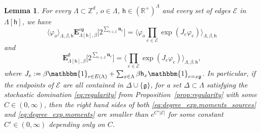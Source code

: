 \documentclass[11pt,a4paper]{article}
\newtheorem{lemma}[theorem]{Lemma}
\theoremstyle{definition}
\numberwithin{equation}{section}
\newcommand\n{\mathbf{n}}
\newcommand\fg{\mathfrak{g}}
\newcommand\Z{\mathbb{Z}}
\begin{document}
\begin{lemma}\label{lem:degree_exp.moments} 
For every $\Lambda\subset \Z^d$, $o\in\Lambda$, $\mathsf{h}\in(\mathbb{R}^+)^\Lambda$ and every set of edges $\mathcal{E}$ in $\Lambda[\mathsf{h}]$, we have
\begin{equation}\label{eq:degree_exp.moments_sources}
\langle\varphi_o\rangle_{\Lambda,\beta,\mathsf{h}}\mathbf{E}_{\Lambda[\mathsf{h}],\beta}^{o\fg} \Big[2^{\sum_{e\in\mathcal{E}} \n_e}\Big] = \langle \varphi_o\prod_{e\in \mathcal{E}}\exp(J_e\varphi_e)\rangle_{\Lambda,\beta,\mathsf{h}}
\end{equation}
and
\begin{equation}\label{eq:degree_exp.moments}
\mathbf{E}_{\Lambda[\mathsf{h}],\beta}^{\emptyset}\Big[2^{\sum_{e\in\mathcal{E}} \n_e}\Big] = \langle \prod_{e\in \mathcal{E}}\exp(J_e \varphi_e)\rangle_{\Lambda,\beta,\mathsf{h}},
\end{equation}
where $J_e:=\beta \mathbbm{1}_{e\in E(\Lambda)}+\sum_{x\in \Lambda}\beta \mathsf{h}_x\mathbbm{1}_{e=x\fg}$.
In particular, if the endpoints of $\mathcal{E}$ are all contained in $\Delta\cup\{\fg\}$, for a set $\Delta\subset \Lambda$ satisfying the stochastic domination \eqref{eq:regularity} from Proposition~\textup{\ref{prop:regularity}} with some $C\in(0,\infty)$, then the right hand sides of both \eqref{eq:degree_exp.moments_sources} and \eqref{eq:degree_exp.moments} are smaller than $e^{C'|\mathcal{E}|}$ for some constant $C'\in(0,\infty)$ depending only on $C$. 
\end{lemma}
\end{document}
